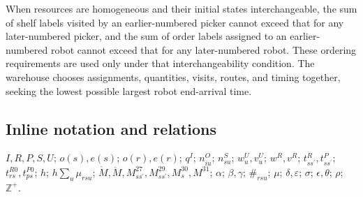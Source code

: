 \documentclass[10pt]{article}
\begin{document}
When resources are homogeneous and their initial states interchangeable, the sum of shelf labels visited by an earlier-numbered picker cannot exceed that for any later-numbered picker, and the sum of order labels assigned to an earlier-numbered robot cannot exceed that for any later-numbered robot. These ordering requirements are used only under that interchangeability condition. The warehouse chooses assignments, quantities, visits, routes, and timing together, seeking the lowest possible largest robot end-arrival time.

\subsection*{Inline notation and relations}
$I,R,P,S,U$; $o(s),e(s)$; $o(r),e(r)$; $q^I$; $n^O_{iu}$; $n^S_{su}$; $w^U_u,v^U_u$; $w^R,v^R$; $t^R_{ss^{\prime}},t^P_{ss^{\prime}}$; $t^{R0}_{rs},t^{P0}_{ps}$; $h$; $h\sum_u\mu_{rsu}$; $\dot M,\ddot M,M^{27}_{ss^{\prime}},M^{29}_{ss^{\prime}},M^{30}_s,M^{31}$; $\alpha$; $\beta,\gamma$; $\#_{rsu}$; $\mu$; $\delta,\varepsilon$; $\sigma$; $\epsilon,\theta$; $\rho$; $\mathbb Z^+$.
\end{document}
